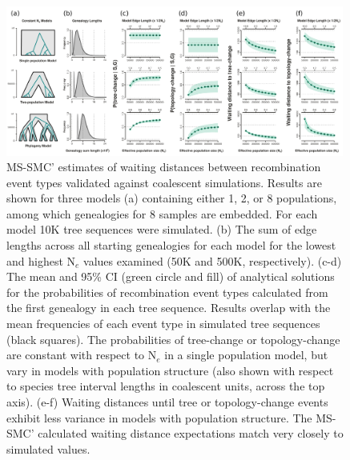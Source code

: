 \documentclass[11pt]{article}
\begin{document}
\begin{figure}[t]
	\centering
	\includegraphics[width=0.99\textwidth]{figures/Fig4-final-validation2.pdf}
	\caption{
		MS-SMC' estimates of waiting distances between recombination
		event types validated against coalescent simulations. Results are 
		shown for three models (a) containing either 1, 2, or 8 populations,
		among which genealogies for 8 samples are embedded. For each model
		10K tree sequences were simulated. 
		(b) The sum of edge lengths across all starting genealogies for each 
		model for the lowest and highest N$_e$ values examined 
		(50K and 500K, respectively).
		(c-d) The mean and 95\% CI (green circle and fill) of analytical
		solutions for the probabilities of recombination event types calculated
		from the first genealogy in each tree sequence. Results overlap 
		with the mean frequencies of each event type in simulated tree 
		sequences (black squares).
		The probabilities of tree-change or topology-change are 
		constant with respect to N$_e$ in a single population model, 
		but vary in models with population structure (also shown with respect to 
		species tree interval lengths in coalescent units, across the top axis). 
		(e-f) Waiting distances until tree or topology-change events exhibit 
		less variance in models with population structure. The MS-SMC' calculated 
		waiting distance expectations match very closely to simulated values.
	}
	\label{fig:fig-validation}
\end{figure}
\end{document}
